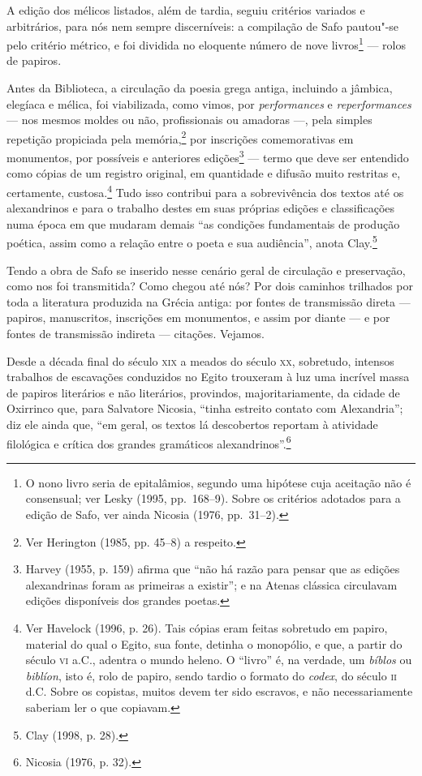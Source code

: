 A edição dos mélicos listados, além de tardia, seguiu critérios variados e
arbitrários, para nós nem sempre discerníveis: a compilação de Safo pautou"-se
pelo critério métrico, e foi dividida no eloquente número de nove
livros\footnote{ O nono livro seria de epitalâmios, segundo uma hipótese cuja
aceitação não é consensual; ver Lesky (1995, pp.~168--9). Sobre os critérios
adotados para a edição de Safo, ver ainda Nicosia (1976, pp.~31--2).}  --- rolos de papiros.

Antes da Biblioteca, a circulação da poesia grega antiga, incluindo a jâmbica,
elegíaca e mélica, foi viabilizada, como vimos, por \textit{performances} e
\textit{reperformances} --- nos mesmos moldes ou não, profissionais ou amadoras ---, pela
simples repetição propiciada pela memória,\footnote{ Ver Herington (1985, pp.
45--8) a respeito.} por inscrições comemorativas em monumentos, por possíveis
e anteriores edições\footnote{ Harvey (1955, p. 159) afirma que “não há razão para pensar
que as edições alexandrinas foram as primeiras a existir”; e na Atenas clássica
circulavam edições disponíveis dos grandes poetas.} --- termo que deve ser
entendido como cópias de um registro original, em quantidade e difusão muito
restritas e, certamente, custosa.\footnote{ Ver Havelock (1996, p. 26). Tais
cópias eram feitas sobretudo em papiro, material do qual o Egito, sua fonte,
detinha o monopólio, e que, a partir do século \textsc{vi} a.C., adentra o mundo heleno.
O “livro” é, na verdade, um \textit{bíblos} ou \textit{biblíon}, isto é, rolo
de papiro, sendo tardio o formato do \textit{codex}, do século \textsc{ii} d.C. Sobre
os copistas, muitos devem ter sido escravos, e não necessariamente saberiam ler
o que copiavam.} Tudo isso contribui para a sobrevivência dos textos até os
alexandrinos e para o trabalho destes em suas próprias edições e classificações
numa época em que mudaram demais “as condições fundamentais de produção
poética, assim como a relação entre o poeta e sua audiência”, anota Clay.\footnote{ Clay (1998, p. 28).} 

Tendo a obra de Safo se inserido nesse cenário geral de circulação e
preservação, como nos foi transmitida? Como chegou até nós? Por dois caminhos
trilhados por toda a literatura produzida na Grécia antiga: por fontes de
transmissão direta --- papiros, manuscritos, inscrições em monumentos, e assim
por diante --- e por fontes de transmissão indireta --- citações. Vejamos. 

Desde a década final do século \textsc{xix} a meados do século \textsc{xx}, sobretudo,
intensos trabalhos de escavações conduzidos no Egito trouxeram à luz uma
incrível massa de papiros literários e não literários, provindos,
majoritariamente, da cidade de Oxirrinco que, para Salvatore Nicosia, “tinha
estreito contato com Alexandria”; diz ele ainda que, “em geral, os
textos lá descobertos reportam à atividade filológica e crítica dos grandes
gramáticos alexandrinos”.\footnote{ Nicosia (1976, p. 32).}

